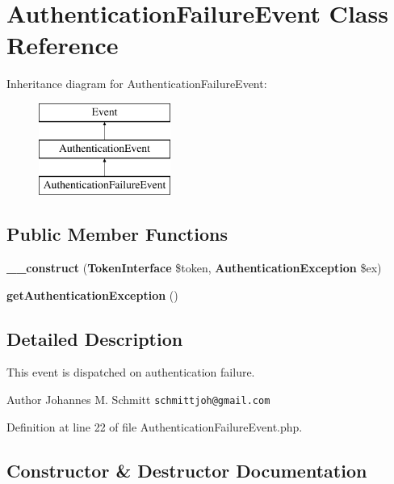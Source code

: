 \section{Authentication\+Failure\+Event Class Reference}
\label{class_symfony_1_1_component_1_1_security_1_1_core_1_1_event_1_1_authentication_failure_event}
Inheritance diagram for Authentication\+Failure\+Event\+:\begin{figure}[H]
\begin{center}
\leavevmode
\includegraphics[height=3.000000cm]{class_symfony_1_1_component_1_1_security_1_1_core_1_1_event_1_1_authentication_failure_event}
\end{center}
\end{figure}
\subsection*{Public Member Functions}
\begin{DoxyCompactItemize}
\item 
{\bf \+\_\+\+\_\+construct} ({\bf Token\+Interface} \$token, {\bf Authentication\+Exception} \$ex)
\item 
{\bf get\+Authentication\+Exception} ()
\end{DoxyCompactItemize}


\subsection{Detailed Description}
This event is dispatched on authentication failure.

\begin{DoxyAuthor}{Author}
Johannes M. Schmitt {\tt schmittjoh@gmail.\+com} 
\end{DoxyAuthor}


Definition at line 22 of file Authentication\+Failure\+Event.\+php.



\subsection{Constructor \& Destructor Documentation}
